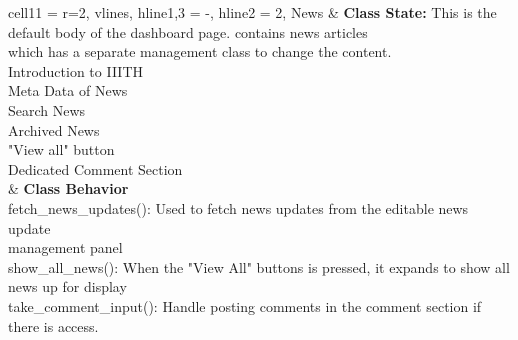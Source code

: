 \documentclass[11pt]{article}
\begin{document}
\begin{longtblr}[
  label = none,
  entry = none,
]{
  cell{1}{1} = {r=2}{},
  vlines,
  hline{1,3} = {-}{},
  hline{2} = {2}{},
}
News & {\textbf{Class State: }This is the default body of the dashboard page. contains news articles \\
which has a separate management class to change the content. \\
\hspace{\dimexpr\labelsep+0.5\tabcolsep}Introduction to IIITH \\
\hspace{\dimexpr\labelsep+0.5\tabcolsep}Meta Data of News\\
\hspace{\dimexpr\labelsep+0.5\tabcolsep}Search News\\
\hspace{\dimexpr\labelsep+0.5\tabcolsep}Archived News\\
\hspace{\dimexpr\labelsep+0.5\tabcolsep}"View all" button\\
\hspace{\dimexpr\labelsep+0.5\tabcolsep}Dedicated Comment Section} \\
     & {\textbf{Class Behavior}\\
\hspace{\dimexpr\labelsep+0.5\tabcolsep}fetch\_news\_updates(): Used to fetch news updates
from the editable news update \\management panel\\
\hspace{\dimexpr\labelsep+0.5\tabcolsep}show\_all\_news(): When the "View All" buttons is pressed,
it expands to show all \\news up for display\\
\hspace{\dimexpr\labelsep+0.5\tabcolsep}take\_comment\_input(): Handle posting comments in the comment
section if \\there is access.}
\end{longtblr}
\end{document}

